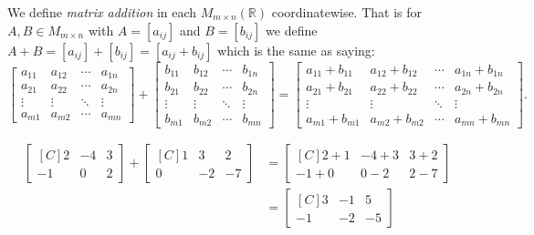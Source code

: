 \begin{definition} We define \emph{matrix addition} in each 
$M_{m\times n}(\mathbb{R})$ coordinatewise. That is for $A,B \in M_{m\times n}$
with $A=[a_{ij}]$ and $B=[b_{ij}]$ we define 
$A+B=[a_{ij}]+[b_{ij}]=[a_{ij}+b_{ij}]$ which is the same as saying:
\[
\begin{bmatrix}
a_{11} & a_{12} & \cdots & a_{1n} \\
a_{21} & a_{22} & \cdots & a_{2n} \\
\vdots & \vdots & \ddots & \vdots \\
a_{m1} & a_{m2} & \cdots & a_{mn}
\end{bmatrix}
+
\begin{bmatrix}
b_{11} & b_{12} & \cdots & b_{1n} \\
b_{21} & b_{22} & \cdots & b_{2n} \\
\vdots & \vdots & \ddots & \vdots \\
b_{m1} & b_{m2} & \cdots & b_{mn}
\end{bmatrix}
=
\begin{bmatrix}
a_{11}+b_{11} & a_{12}+b_{12} & \cdots & a_{1n}+b_{1n} \\
a_{21}+b_{21} & a_{22}+b_{22} & \cdots & a_{2n}+b_{2n} \\
\vdots        & \vdots        & \ddots & \vdots \\
a_{m1}+b_{m1} & a_{m2}+b_{m2} & \cdots & a_{mn}+b_{mn}
\end{bmatrix}.
\]
\end{definition}

\begin{example}
\begin{align*}
\begin{bmatrix*}[C]
2  & -4 & 3 \\
-1 & 0  & 2
\end{bmatrix*}+
\begin{bmatrix*}[C]
1  & 3 & 2 \\
0 & -2  & -7
\end{bmatrix*}
&=\begin{bmatrix*}[C]
2+1  & -4+3 & 3+2 \\
-1+0 & 0-2  & 2-7
\end{bmatrix*}\\
&=\begin{bmatrix*}[C]
3  & -1 & 5 \\
-1 & -2  & -5
\end{bmatrix*}
\end{align*}
\end{example}

